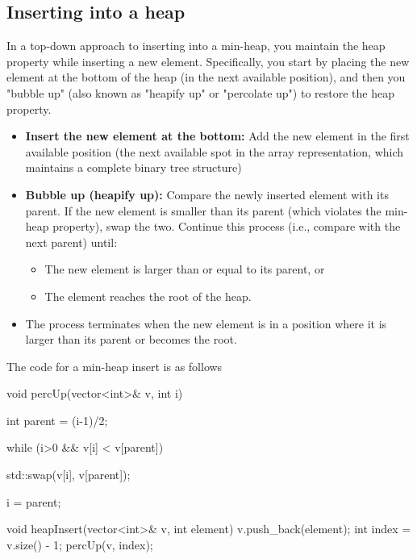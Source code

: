 \documentclass{report}
\begin{document}
\pagebreak 
\subsection{Inserting into a heap}
\bigbreak \noindent 
In a top-down approach to inserting into a min-heap, you maintain the heap property while inserting a new element. Specifically, you start by placing the new element at the bottom of the heap (in the next available position), and then you "bubble up" (also known as "heapify up" or "percolate up") to restore the heap property.
\begin{itemize}
    \item \textbf{Insert the new element at the bottom:} Add the new element in the first available position (the next available spot in the array representation, which maintains a complete binary tree structure)
    \item \textbf{Bubble up (heapify up):} Compare the newly inserted element with its parent.
        \bigbreak \noindent 
        If the new element is smaller than its parent (which violates the min-heap property), swap the two.
        \bigbreak \noindent 
        Continue this process (i.e., compare with the next parent) until:
        \begin{itemize}
            \item The new element is larger than or equal to its parent, or
            \item The element reaches the root of the heap.
        \end{itemize}
    \item The process terminates when the new element is in a position where it is larger than its parent or becomes the root.
\end{itemize}
\bigbreak \noindent 
The code for a min-heap insert is as follows
\bigbreak \noindent 
\begin{cppcode}
    void percUp(vector<int>& v, int i) {
        int parent = (i-1)/2;

        while (i>0 && v[i] < v[parent]) {
            std::swap(v[i], v[parent]);

            i = parent;
        }
    }

    void heapInsert(vector<int>& v, int element) {
        v.push_back(element);
        int index = v.size() - 1;
        percUp(v, index);
    }
\end{cppcode}

\pagebreak 
\end{document}
